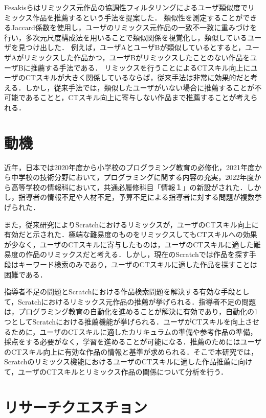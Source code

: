 \documentclass[11pt]{jreport}
\begin{document}
Fesakisらはリミックス元作品の協調性フィルタリングによるユーザ類似度でリミックス作品を推薦するという手法を提案した\cite{fesakis2009proposing}．
類似性を測定することができるJaccard係数を使用し，ユーザのリミックス元作品の一致不一致に重みづけを行い，多次元尺度構成法を用いることで類似関係を視覚化し，類似しているユーザを見つけ出した．
例えば，ユーザAとユーザBが類似しているとすると，ユーザAがリミックスした作品かつ，ユーザBがリミックスしたことのない作品をユーザBに推薦する手法である．
リミックスを行うことによるCTスキル向上にユーザのCTスキルが大きく関係しているならば，従来手法は非常に効果的だと考える．しかし，従来手法では，類似したユーザがいない場合に推薦することが不可能であることと，CTスキル向上に寄与しない作品まで推薦することが考えられる．


\section{動機}
近年，日本では2020年度から小学校のプログラミング教育の必修化，2021年度から中学校の技術分野において，プログラミングに関する内容の充実，2022年度から高等学校の情報科において，共通必履修科目「情報１」の新設がされた\cite{monkashou}．しかし，指導者の情報不足や人材不足，予算不足による指導者に対する問題が複数挙げられた\cite{monkashou2}．

また，従来研究によりScratchにおけるリミックスが，ユーザのCTスキル向上に有効だと示された．極端な難易度のものをリミックスしてもCTスキルへの効果が少なく，ユーザのCTスキルに寄与したものは，ユーザのCTスキルに適した難易度の作品のリミックスだと考える．しかし，現在のScratchでは作品を探す手段はキーワード検索のみであり，ユーザのCTスキルに適した作品を探すことは困難である．

指導者不足の問題とScratchにおける作品検索問題を解決する有効な手段として，Scratchにおけるリミックス元作品の推薦が挙げられる．指導者不足の問題は，プログラミング教育の自動化を進めることが解決に有効であり，自動化の1つとしてScratchにおける推薦機能が挙げられる．ユーザがCTスキルを向上させるために，ユーザのCTスキルに適したカリキュラムの準備や参考作品の準備，採点をする必要がなく，学習を進めることが可能になる．推薦のためにはユーザのCTスキル向上に有効な作品の情報と基準が求められる．そこで本研究では，Scratchのリミックス機能におけるユーザのCTスキルに適した作品推薦に向けて，ユーザのCTスキルとリミックス作品の関係について分析を行う．

\section{リサーチクエスチョン}
\end{document}
